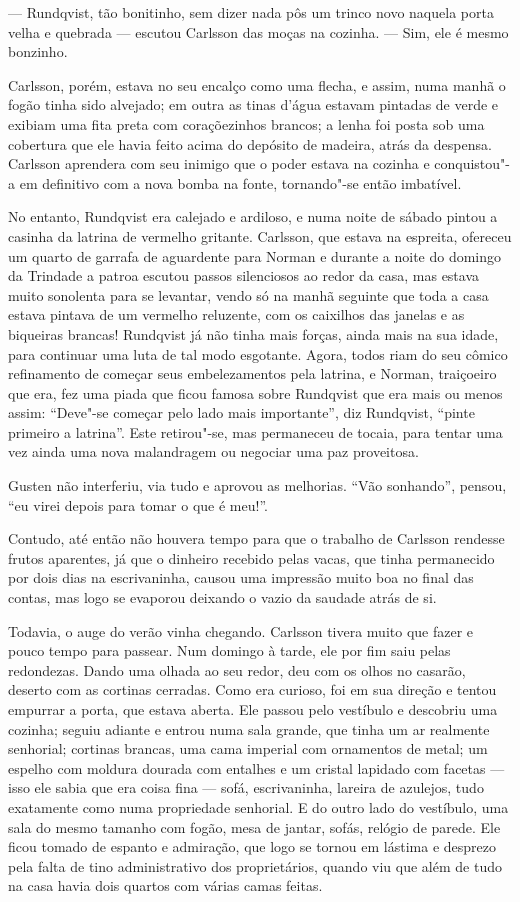 --- Rundqvist, tão bonitinho, sem dizer nada pôs um trinco novo naquela porta
velha e quebrada --- escutou Carlsson das moças na cozinha. --- Sim, ele é mesmo
bonzinho.

Carlsson, porém, estava no seu encalço como uma flecha, e assim, numa manhã o
fogão tinha sido alvejado; em outra as tinas d’água estavam pintadas de verde e
exibiam uma fita preta com coraçõezinhos brancos; a lenha foi posta sob uma
cobertura que ele havia feito acima do depósito de madeira, atrás da despensa.
Carlsson aprendera com seu inimigo que o poder estava na cozinha e conquistou"-a
em definitivo com a nova bomba na fonte, tornando"-se então imbatível.

No entanto, Rundqvist era calejado e ardiloso, e numa noite de sábado pintou
a casinha da latrina de vermelho gritante. Carlsson, que estava na espreita,
ofereceu um quarto de garrafa de aguardente para Norman e durante a noite do domingo
da Trindade a patroa escutou passos silenciosos ao redor da casa, mas estava muito
sonolenta para se levantar, vendo só na manhã seguinte que toda a casa estava
pintava de um vermelho reluzente, com os caixilhos das janelas e as biqueiras
brancas! Rundqvist já não tinha mais forças, ainda mais na sua idade,
para continuar uma luta de tal modo esgotante. Agora, todos riam do seu cômico
refinamento de começar seus embelezamentos pela latrina, e Norman, 
traiçoeiro que era, fez uma piada que ficou famosa sobre Rundqvist que era mais ou menos assim:
``Deve"-se começar pelo lado mais importante'', diz Rundqvist, ``pinte primeiro a
latrina''. Este retirou"-se, mas permaneceu de tocaia, para tentar uma vez ainda uma nova
malandragem ou negociar uma paz proveitosa.

Gusten não interferiu, via tudo e aprovou as melhorias. ``Vão sonhando'',
pensou, ``eu virei depois para tomar o que é meu!''.

Contudo, até então não houvera tempo para que o trabalho de Carlsson rendesse
frutos aparentes, já que o dinheiro recebido pelas vacas, que tinha permanecido por
dois dias na escrivaninha, causou uma impressão muito boa no final das contas, mas
logo se evaporou deixando o vazio da saudade atrás de si.

Todavia, o auge do verão vinha chegando. Carlsson tivera muito que fazer e pouco
tempo para passear. Num domingo à tarde, ele por fim saiu pelas redondezas.
Dando uma olhada ao seu redor, deu com os olhos no casarão, deserto com as cortinas
cerradas. Como era curioso, foi em sua direção e tentou empurrar a porta, que
estava aberta. Ele passou pelo vestíbulo e descobriu uma cozinha; seguiu adiante
e entrou numa sala grande, que tinha um ar realmente senhorial; cortinas brancas,
uma cama imperial com ornamentos de metal; um espelho com moldura dourada com
entalhes e um cristal lapidado com facetas --- isso ele sabia que era coisa fina
--- sofá, escrivaninha, lareira de azulejos, tudo exatamente como numa propriedade
senhorial. E do outro lado do vestíbulo, uma sala do mesmo tamanho com fogão,
mesa de jantar, sofás, relógio de parede. Ele ficou tomado de espanto e
admiração, que logo se tornou em lástima e desprezo pela falta de tino
administrativo dos proprietários, quando viu que além de tudo na casa havia
dois quartos com várias camas feitas.

